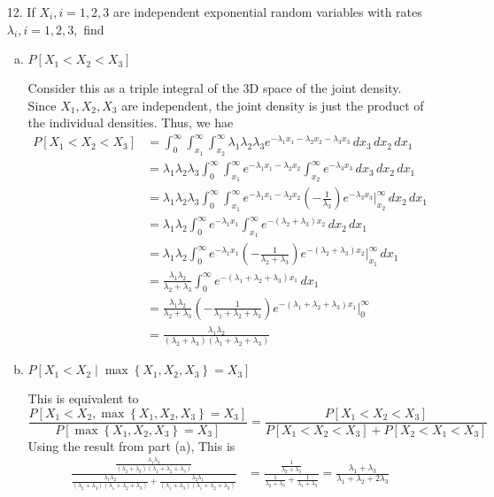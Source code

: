 \documentclass{article}
\begin{document}
\begin{itemize}
	\item[12.] If $X_i, i=1, 2, 3$ are independent exponential random variables with rates $\lambda_i, i=1, 2, 3,$ find
		\begin{enumerate}[(a)]
			\item $P[X_1<X_2<X_3]$
				\begin{soln}
					Consider this as a triple integral of the 3D space of the joint density. Since $X_1, X_2, X_3$ are independent, the joint density is just the product of the individual densities. Thus, we hae
					\begin{align*}
						P[X_1<X_2<X_3] &= \int_0^\infty \int_{x_1}^\infty \int_{x_2}^\infty \lambda_1 \lambda_2 \lambda_3 e^{-\lambda_1x_1-\lambda_2x_2-\lambda_3x_3}\, dx_3\,dx_2\,dx_1 \\
						&= \lambda_1\lambda_2\lambda_3 \int_0^\infty \int_{x_1}^\infty e^{-\lambda_1x_1-\lambda_2x_2}\int_{x_2}^\infty e^{-\lambda_3x_3}\, dx_3\, dx_2\, dx_1 \\
						&= \lambda_1\lambda_2\lambda_3\int_0^\infty\int_{x_1}^\infty e^{-\lambda_1x_1-\lambda_2x_2}\left( -\frac{1}{\lambda_3} \right) e^{-\lambda_3x_3}\bigg\vert^\infty_{x_2}\, dx_2\, dx_1 \\
						&= \lambda_1\lambda_2 \int_0^\infty e^{-\lambda_1x_1} \int_{x_1}^\infty e^{-(\lambda_2+\lambda_3)x_2}\, dx_2\, dx_1 \\
						&= \lambda_1\lambda_2 \int_0^\infty e^{-\lambda_1x_1} \left( -\frac{1}{\lambda_2+\lambda_3} \right)e^{-(\lambda_2+\lambda_3)x_2}\bigg\vert^{\infty}_{x_1}\, dx_1 \\
						&= \frac{\lambda_1\lambda_2}{\lambda_2+\lambda_3}\int_0^\infty e^{-(\lambda_1+\lambda_2+\lambda_3)x_1}\, dx_1 \\
						&= \frac{\lambda_1\lambda_2}{\lambda_2+\lambda_3}\left( -\frac{1}{\lambda_1+\lambda_2+\lambda_3} \right)e^{-(\lambda_1+\lambda_2+\lambda_3)x_1} \bigg\vert^{\infty}_0 \\
						&= \boxed{\frac{\lambda_1\lambda_2}{(\lambda_2+\lambda_3)(\lambda_1+\lambda_2+\lambda_3)}}
					\end{align*}
				\end{soln}

			\item $P[X_1<X_2\mid \max\left\{ X_1, X_2, X_3 \right\}=X_3]$
				\begin{soln}
					This is equivalent to
					\[\frac{P[X_1<X_2, \max\left\{ X_1, X_2, X_3 \right\}=X_3]}{P[\max\left\{ X_1, X_2, X_3 \right\}=X_3]}=\frac{P[X_1<X_2< X_3]}{P[X_1<X_2<X_3] + P[X_2<X_1<X_3]}\]
					Using the result from part (a), This is
					\begin{align*}
						\frac{\frac{\lambda_1\lambda_2}{(\lambda_2+\lambda_3)(\lambda_1+\lambda_2+\lambda_3)}}{\frac{\lambda_1\lambda_2}{(\lambda_2+\lambda_3)(\lambda_1+\lambda_2+\lambda_3)}+\frac{\lambda_2\lambda_1}{(\lambda_1+\lambda_3)(\lambda_1+\lambda_2+\lambda_3)}} &= \frac{\frac{1}{\lambda_2+\lambda_3}}{\frac{1}{\lambda_2+\lambda_3} + \frac{1}{\lambda_1+\lambda_3}} = \boxed{\frac{\lambda_1+\lambda_3}{\lambda_1+\lambda_2+2\lambda_3}}
					\end{align*}
				\end{soln}


\end{enumerate}
\end{itemize}
\end{document}
